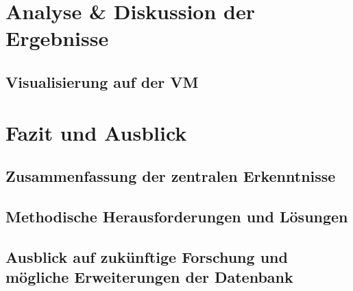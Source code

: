 \documentclass[12pt, a4paper, ngerman, bidi=default]{article}
\begin{document}
\section{Analyse \& Diskussion der Ergebnisse}
\subsection{Visualisierung auf der VM}

\section{Fazit und Ausblick}
\subsection{Zusammenfassung der zentralen Erkenntnisse}
\subsection{Methodische Herausforderungen und Lösungen}
\subsection{Ausblick auf zukünftige Forschung und mögliche Erweiterungen der Datenbank}
\newpage










\end{document}

